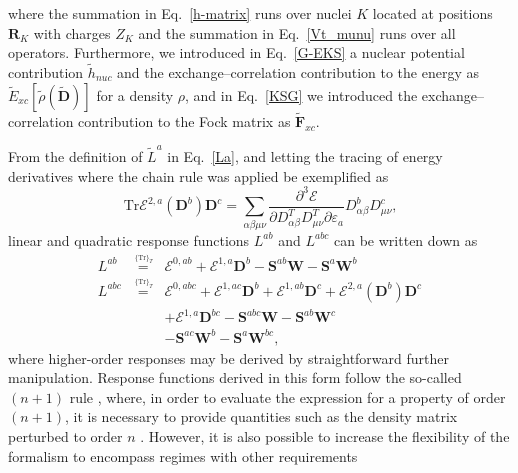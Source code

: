 \documentclass[%
 reprint,
 amsmath,amssymb,
 aps,
]{revtex4-1}
\begin{document}
where the summation in Eq.~\eqref{h-matrix} runs over nuclei $K$ located at
positions $\mathbf{R}_{K}$ with charges $Z_{K}$ and the summation in
Eq.~\eqref{Vt_munu} runs over all  operators. Furthermore,
we introduced in Eq.~\eqref{G-EKS} a nuclear potential contribution
$\tilde{h}_{nuc}$ and the exchange--correlation contribution to the energy as
$\tilde{E}_{xc}[\tilde{\rho}(\tilde{\mathbf{D}})]$ for a density $\rho$, and in
Eq.~\eqref{KSG} we introduced the exchange--correlation contribution to the
Fock matrix as $\tilde{\mathbf{F}}_{xc}$. 

From the definition of $\tilde{L}^{a}$ in Eq.~\eqref{La}, and letting the
tracing of energy derivatives where the chain rule was applied be exemplified
as
\begin{equation}\label{trEchain}
\text{Tr}\mathcal{E}^{2, a}(\mathbf{D}^{b})\mathbf{D}^{c} = \sum_{\alpha \beta \mu \nu} \frac{\partial^{3} \mathcal{E}}{\partial D^{T}_{\alpha \beta} D^{T}_{\mu \nu} \partial \varepsilon_{a}} D^{b}_{\alpha \beta} D^{c}_{\mu \nu} \text{,}
\end{equation}
linear and quadratic response functions $L^{ab}$ and $L^{abc}$ can be written down as
\begin{eqnarray}
L^{ab} & \stackrel{\,^{\{\mathrm{Tr}\}_T}}{=} & \mathcal{E}^{0,ab}+\bm{\mathcal{E}}^{1,a}\mathbf{D}^{b}-\mathbf{S}^{ab}\mathbf{W}-\mathbf{S}^{a}\mathbf{W}^{b}\label{QagraD}\\
L^{abc} & \stackrel{\,^{\{\mathrm{Tr}\}_T}}{=} & \mathcal{E}^{0,abc}+\bm{\mathcal{E}}^{1,ac}\mathbf{D}^{b}+\bm{\mathcal{E}}^{1,ab}\mathbf{D}^{c}+\bm{\mathcal{E}}^{2,a}\!(\mathbf{D}^{b})\mathbf{D}^{c}\nonumber \\
 &&+ \bm{\mathcal{E}}^{1,a}\mathbf{D}^{bc}-\mathbf{S}^{abc}\mathbf{W}-\mathbf{S}^{ab}\mathbf{W}^{c} \\
&&- \mathbf{S}^{ac}\mathbf{W}^{b}-\mathbf{S}^{a}\mathbf{W}^{bc}\label{QabgraD} \text{,}
\end{eqnarray}
where higher-order responses may be derived by straightforward further
manipulation. Response functions derived in this form follow the so-called
$(n+1)$ rule , where, in order to evaluate the expression for a
property of order $(n+1)$, it is necessary to provide quantities such as the
density matrix perturbed to order $n$ . However, it is also possible to increase the
flexibility of the formalism to encompass regimes with other requirements
\end{document}
